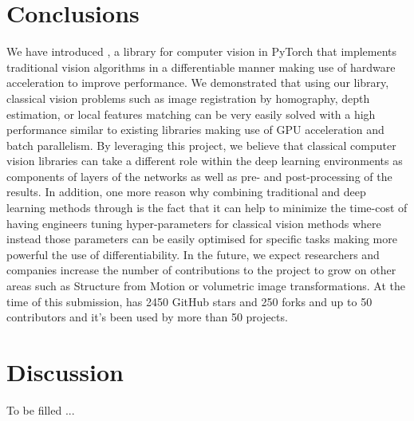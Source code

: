 \section{Conclusions}
We have introduced \lib, a library for computer vision in PyTorch that implements traditional vision algorithms in a differentiable manner making use of hardware acceleration to improve performance. We demonstrated that using our library, classical vision problems such as image registration by homography, depth estimation, or local features matching can be very easily solved with a high performance similar to existing libraries making use of GPU acceleration and batch parallelism. By leveraging this project, we believe that classical computer vision libraries can take a different role within the deep learning environments as components of layers of the networks as well as pre- and post-processing of the results. In addition, one more reason why combining traditional and deep learning methods through \lib{} is the fact that it can help to minimize the time-cost of having engineers tuning hyper-parameters for classical vision methods where instead those parameters can be easily optimised for specific tasks making more powerful the use of differentiability. In the future, we expect researchers and companies increase the number of contributions to the project to grow on other areas such as Structure from Motion or volumetric image transformations. At the time of this submission, \lib{} has 2450 GitHub stars and 250 forks and up to 50 contributors and it's been used by more than 50 projects.

\section{Discussion}


To be filled ...